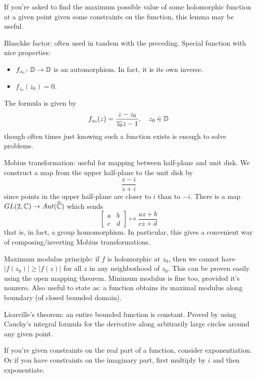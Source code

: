 If you're asked to find the maximum possible value of some holomorphic function at a given point given some constraints on the function, this lemma may be useful.

Blaschke factor: often used in tandem with the preceding. Special function with nice properties:
\begin{itemize}
	\item $f_{z_0} \colon \mathbb{D} \to \mathbb{D}$ is an automorphism. In fact, it is its own inverse.
	\item $f_{z_0}(z_0) = 0$.
\end{itemize}
The formula is given by
\[
	f_{z_0}(z)=\frac{z-z_0}{\overline{z_0} z - 1}, \quad z_0 \in \mathbb{D}
\]
though often times just knowing such a function exists is enough to solve problems.

Mobius transformation: useful for mapping between half-plane and unit disk. We construct a map from the upper half-plane to the unit disk by
\[
	\frac{z-i}{z+i}
\]
since points in the upper half-plane are closer to $i$ than to $-i$. There is a map $GL(2,\mathbb{C}) \to Aut(\mathbb{\widehat{\mathbb{C}}})$
which sends
\[
	\begin{bmatrix}
	a & b\\
	c & d
	\end{bmatrix} \mapsto \frac{az + b}{cz + d}
\]
that is, in fact, a group homomorphism. In particular, this gives a convenient way of composing/inverting Mobius transformations.

Maximum modulus principle: if $f$ is holomorphic at $z_0$, then we cannot have $|f(z_0)| \geq |f(z)|$ for all $z$ in any neighborhood of $z_0$. This can be proven easily using the open mapping theorem. Minimum modulus is fine too, provided it's nonzero. Also useful to state as: a function obtains its maximal modulus along boundary (of closed bounded domain).

Liouville's theorem: an entire bounded function is constant. Proved by using Cauchy's integral formula for the derivative along arbitrarily large circles around any given point.

If you're given constraints on the real part of a function, consider exponentiation. Or if you have constraints on the imaginary part, first multiply by $i$ and then exponentiate.